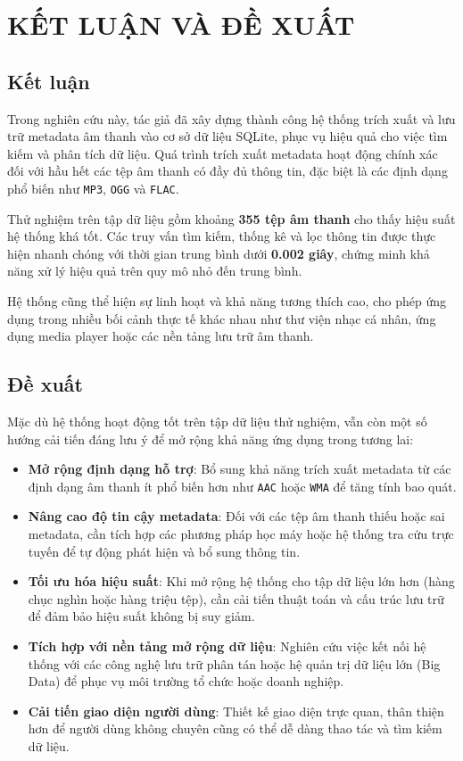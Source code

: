 \documentclass[conference]{IEEEtran}
\begin{document}
\section{KẾT LUẬN VÀ ĐỀ XUẤT}

\subsection{Kết luận}
Trong nghiên cứu này, tác giả đã xây dựng thành công hệ thống trích xuất và lưu trữ metadata âm thanh vào cơ sở dữ liệu SQLite, phục vụ hiệu quả cho việc tìm kiếm và phân tích dữ liệu. Quá trình trích xuất metadata hoạt động chính xác đối với hầu hết các tệp âm thanh có đầy đủ thông tin, đặc biệt là các định dạng phổ biến như \texttt{MP3}, \texttt{OGG} và \texttt{FLAC}.

Thử nghiệm trên tập dữ liệu gồm khoảng \textbf{355 tệp âm thanh} cho thấy hiệu suất hệ thống khá tốt. Các truy vấn tìm kiếm, thống kê và lọc thông tin được thực hiện nhanh chóng với thời gian trung bình dưới \textbf{0.002 giây}, chứng minh khả năng xử lý hiệu quả trên quy mô nhỏ đến trung bình.

Hệ thống cũng thể hiện sự linh hoạt và khả năng tương thích cao, cho phép ứng dụng trong nhiều bối cảnh thực tế khác nhau như thư viện nhạc cá nhân, ứng dụng media player hoặc các nền tảng lưu trữ âm thanh.

\subsection{Đề xuất}
Mặc dù hệ thống hoạt động tốt trên tập dữ liệu thử nghiệm, vẫn còn một số hướng cải tiến đáng lưu ý để mở rộng khả năng ứng dụng trong tương lai:

\begin{itemize}
    \item \textbf{Mở rộng định dạng hỗ trợ}: Bổ sung khả năng trích xuất metadata từ các định dạng âm thanh ít phổ biến hơn như \texttt{AAC} hoặc \texttt{WMA} để tăng tính bao quát.
    
    \item \textbf{Nâng cao độ tin cậy metadata}: Đối với các tệp âm thanh thiếu hoặc sai metadata, cần tích hợp các phương pháp học máy hoặc hệ thống tra cứu trực tuyến để tự động phát hiện và bổ sung thông tin.
    
    \item \textbf{Tối ưu hóa hiệu suất}: Khi mở rộng hệ thống cho tập dữ liệu lớn hơn (hàng chục nghìn hoặc hàng triệu tệp), cần cải tiến thuật toán và cấu trúc lưu trữ để đảm bảo hiệu suất không bị suy giảm.
    
    \item \textbf{Tích hợp với nền tảng mở rộng dữ liệu}: Nghiên cứu việc kết nối hệ thống với các công nghệ lưu trữ phân tán hoặc hệ quản trị dữ liệu lớn (Big Data) để phục vụ môi trường tổ chức hoặc doanh nghiệp.
    
    \item \textbf{Cải tiến giao diện người dùng}: Thiết kế giao diện trực quan, thân thiện hơn để người dùng không chuyên cũng có thể dễ dàng thao tác và tìm kiếm dữ liệu.
\end{itemize}
\end{document}
